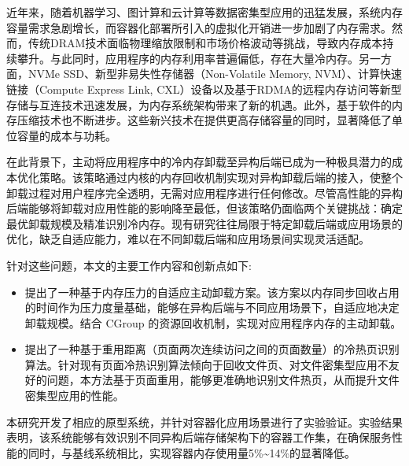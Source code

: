 	
\begin{chineseabstract}

近年来，随着机器学习、图计算和云计算等数据密集型应用的迅猛发展，系统内存容量需求急剧增长，而容器化部署所引入的虚拟化开销进一步加剧了内存需求。然而，传统DRAM技术面临物理缩放限制和市场价格波动等挑战，导致内存成本持续攀升。与此同时，应用程序的内存利用率普遍偏低，存在大量冷内存。另一方面，NVMe SSD、新型非易失性存储器（Non-Volatile Memory, NVM）、计算快速链接（Compute Express Link, CXL）设备以及基于RDMA的远程内存访问等新型存储与互连技术迅速发展，为内存系统架构带来了新的机遇。此外，基于软件的内存压缩技术也不断进步。这些新兴技术在提供更高存储容量的同时，显著降低了单位容量的成本与功耗。

在此背景下，主动将应用程序中的冷内存卸载至异构后端已成为一种极具潜力的成本优化策略。该策略通过内核的内存回收机制实现对异构卸载后端的接入，使整个卸载过程对用户程序完全透明，无需对应用程序进行任何修改。尽管高性能的异构后端能够将卸载对应用性能的影响降至最低，但该策略仍面临两个关键挑战：确定最优卸载规模及精准识别冷内存。现有研究往往局限于特定卸载后端或应用场景的优化，缺乏自适应能力，难以在不同卸载后端和应用场景间实现灵活适配。

针对这些问题，本文的主要工作内容和创新点如下:
\begin{itemize}
    \item 提出了一种基于内存压力的自适应主动卸载方案。该方案以内存同步回收占用的时间作为压力度量基础，能够在异构后端与不同应用场景下，自适应地决定卸载规模。结合 CGroup 的资源回收机制，实现对应用程序内存的主动卸载。
    \item 提出了一种基于重用距离（页面两次连续访问之间的页面数量）的冷热页识别算法。针对现有页面冷热识别算法倾向于回收文件页、对文件密集型应用不友好的问题，本方法基于页面重用，能够更准确地识别文件热页，从而提升文件密集型应用的性能。
\end{itemize}

本研究开发了相应的原型系统，并针对容器化应用场景进行了实验验证。实验结果表明，该系统能够有效识别不同异构后端存储架构下的容器工作集，在确保服务性能的同时，与基线系统相比，实现容器内存使用量5\%\~{}14\%的显著降低。

\end{chineseabstract}
